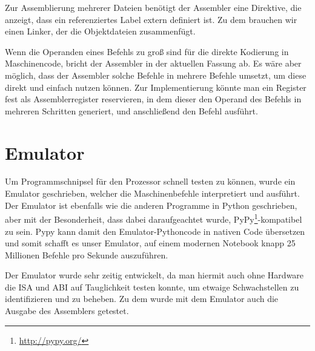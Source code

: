 Zur Assemblierung mehrerer Dateien benötigt der Assembler eine Direktive, die anzeigt, dass ein referenziertes Label extern definiert ist. Zu dem brauchen wir einen Linker, der die Objektdateien zusammenfügt.

Wenn die Operanden eines Befehls zu groß sind für die direkte Kodierung in Maschinencode, bricht der Assembler in der aktuellen Fassung ab. Es wäre aber möglich, dass der Assembler solche Befehle in mehrere Befehle umsetzt, um diese direkt und einfach nutzen können. Zur Implementierung könnte man ein Register fest als Assemblerregister reservieren, in dem dieser den Operand des Befehls in mehreren Schritten generiert, und anschließend den Befehl ausführt.

\section{Emulator}
Um Programmschnipsel für den Prozessor schnell testen zu können, wurde ein Emulator geschrieben, welcher die Maschinenbefehle interpretiert und ausführt. Der Emulator ist ebenfalls wie die anderen Programme in Python geschrieben, aber mit der Besonderheit, dass dabei daraufgeachtet wurde, PyPy\footnote{\url{http://pypy.org/}}-kompatibel zu sein. Pypy kann damit den Emulator-Pythoncode in nativen Code übersetzen und somit schafft es unser Emulator, auf einem modernen Notebook knapp 25 Millionen Befehle pro Sekunde auszuführen.

Der Emulator wurde sehr zeitig entwickelt, da man hiermit auch ohne Hardware die ISA und ABI auf Tauglichkeit testen konnte, um etwaige Schwachstellen zu identifizieren und zu beheben. Zu dem wurde mit dem Emulator auch die Ausgabe des Assemblers getestet.

